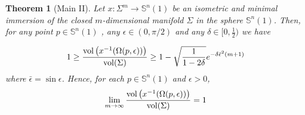 \documentclass{amsart}
\newtheorem{theorem}{Theorem}[section]
\theoremstyle{definition}
\theoremstyle{remark}
\newcommand{\ese}{\mathbb{S}}
\providecommand{\DIFaddbegin}{} %
\providecommand{\DIFaddend}{} %
\providecommand{\DIFdelbegin}{} %
\providecommand{\DIFdelend}{} %
\begin{document}
\begin{theorem}[Main II]\label{extconc2}
Let  $x: \Sigma^m \to \mathbb{S}^n(1)$ be an isometric and minimal immersion of the closed $m$-dimensional manifold $\Sigma$ in the sphere  $\mathbb{S}^n(1)$. Then, for any point $p \in \mathbb{S}^n(1)$ , any  $\epsilon \in (0,\pi/2)$ and any $\delta\in [0,\frac{1}{2})$ we have 

\begin{equation}\DIFdelbegin %
\DIFdelend \DIFaddbegin \label{eq4Bis}
\DIFaddend 1\geq \frac{{\rm vol}\left(x^{-1}(\Omega(p,\epsilon))\right)}{{\rm vol}(\Sigma)}\geq  1- \sqrt{\frac{1}{1-2\delta}}e^{-\delta\bar\epsilon^2(m+1)}
\end{equation}
where $\bar\epsilon=\sin\epsilon$.  Hence, for each $p \in \ese^n(1)$ and $\epsilon>0$,
$$
\lim_{m\to\infty}\frac{{\rm vol}\left(x^{-1}(\Omega(p,\epsilon))\right)}{{\rm vol}(\Sigma)}=1
$$
\end{theorem}
\end{document}
